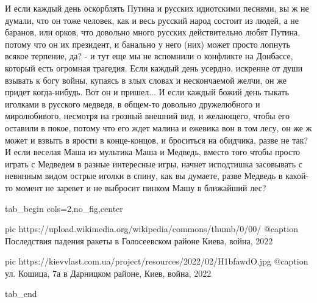 И если каждый день оскорблять Путина и русских идиотскими песнями, вы ж не
думали, что он тоже человек, как и весь русский народ состоит из людей, а не
баранов, или орков, что довольно много русских действительно любят Путина,
потому что он их президент, и банально у него (них) может просто лопнуть всякое
терпение, да? -  и тут еще мы не вспомнили о конфликте на Донбассе, который
есть огромная трагедия. Если каждый день усердно, искренне от души взывать к
богу войны, купаясь в злых словах и нескончаемой желчи, он же придет
когда-нибудь. Вот он и пришел... И если каждый божий день тыкать иголками в
русского медведя, в общем-то довольно дружелюбного и миролюбивого, несмотря на
грозный внешний вид, и желающего, чтобы его оставили в покое, потому что его
ждет малина и ежевика вон в том лесу, он же ж может и взвыть в ярости в
конце-концов, и броситься на обидчика, разве не так? И если веселая Маша из
мультика Маша и Медведь, вместо того чтобы просто играть с Медведем в разные
интересные игры, начнет исподтишка засовывать с невинным видом острые иголки в
спину, как вы думаете, разве Медведь в какой-то момент не заревет и не выбросит
пинком Машу в ближайший лес?

\ifcmt
  tab_begin cols=2,no_fig,center

     pic https://upload.wikimedia.org/wikipedia/commons/thumb/0/00/%
     @caption Последствия падения ракеты в Голосеевском районе Киева, война, 2022
     
     pic https://kievvlast.com.ua/project/resources/2022/02/H1bfawdO.jpg
     @caption ул. Кошица, 7а в Дарницком районе, Киев, война, 2022

  tab_end
\fi


